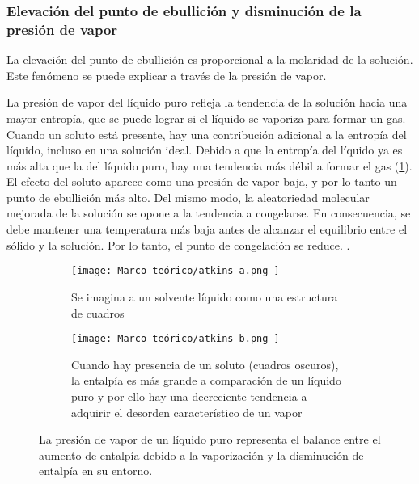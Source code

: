 		\subsubsection{Elevación del punto de ebullición y disminución de la presión de vapor}
			
			La elevación del punto de ebullición es proporcional a la molaridad de la solución. Este fenómeno se puede explicar a través de la presión de vapor.
			
			\begin{displayquote}
				La presión de vapor del líquido puro refleja la tendencia de la solución hacia una mayor entropía, que se puede lograr si el líquido se vaporiza para formar un gas. Cuando un soluto está presente, hay una contribución adicional a la entropía del líquido, incluso en una solución ideal. Debido a que la entropía del líquido ya es más alta que la del líquido puro, hay una tendencia más débil a formar el gas (\cref{fig:coligativas-pv}). El efecto del soluto aparece como una presión de vapor baja, y por lo tanto un punto de ebullición más alto. Del mismo modo, la aleatoriedad molecular mejorada de la solución se opone a la tendencia a congelarse. En consecuencia, se debe mantener una temperatura más baja antes de alcanzar el equilibrio entre el sólido y la solución. Por lo tanto, el punto de congelación se reduce. \cite{atkins_physical_2010}.
			\end{displayquote}
			\begin{figure}[H]
				\centering
				\begin{subfigure}[t]{0.45\linewidth}
					\centering
					\texttt{[image: 
						Marco-teórico/atkins-a.png
					]}
					\caption{Se imagina a un solvente líquido como una estructura de cuadros}
				\end{subfigure}
				\hfill
				\begin{subfigure}[t]{0.45\linewidth}
					\centering
					\texttt{[image: 
						Marco-teórico/atkins-b.png
					]}
					\caption{Cuando hay presencia de un soluto (cuadros oscuros), la entalpía es más grande a comparación de un líquido puro y por ello hay una decreciente tendencia a adquirir el desorden característico de un vapor}
				\end{subfigure}
				
				\caption{La presión de vapor de un líquido puro representa el balance entre el aumento de entalpía debido a la vaporización y la disminución de entalpía en su entorno.}
				\label{fig:coligativas-pv}
			\end{figure}